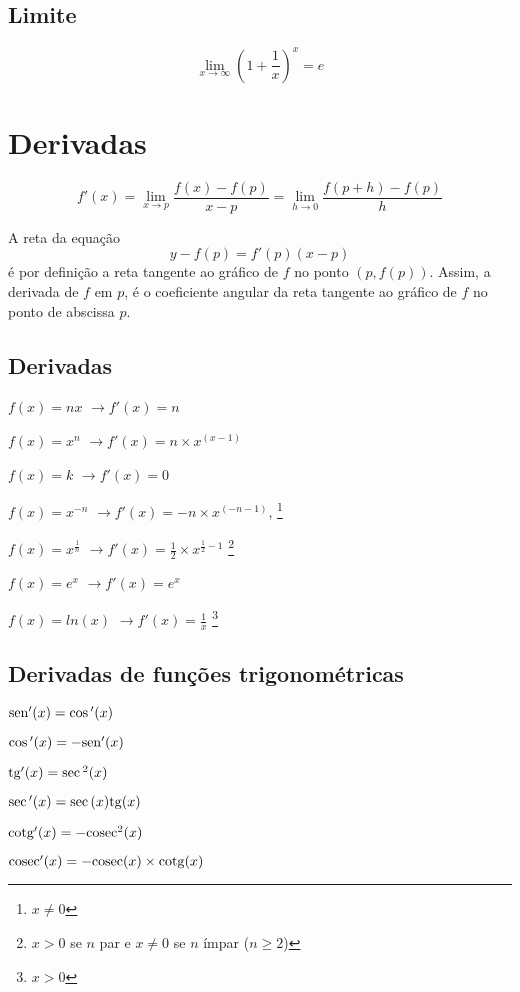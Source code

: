 \documentclass[11pt]{article}
\newcommand{\sen}{{\rm sen}}
\newcommand{\tg}{{\rm tg}}
\newcommand{\cosec}{{\rm cosec}}
\newcommand{\cotg}{{\rm cotg}}
\newcommand{\limit}[3]{{
  \underset{#1 \rightarrow #2}{\lim} #3
}}
\begin{document}
\subsection{Limite}

$$
\limit{x}{\infty}{(1+\frac{1}{x})^x} = e
$$

\section{Derivadas}

$$
f'(x) =
  \limit{x}{p}{ \frac{f(x) - f(p)}{x-p} =
  \limit{h}{0}{ \frac{f(p+h)- f(p)}{h} } }
$$

A reta da equação $$y-f(p)=f'(p)(x-p)$$ é por definição a reta tangente ao
gráfico de $f$ no ponto $(p, f(p))$. Assim, a derivada de $f$ em $p$, é o
coeficiente angular da reta tangente ao gráfico de $f$ no ponto de abscissa
$p$.

\subsection{Derivadas}

\begin{description}
  \begin{multicols}{2}
    \item[ $f(x) = nx$ ]       $ \to f'(x) = n $
    \item[ $f(x) = x^n$ ]      $ \to f'(x) = n\times x^{(x-1)}$
    \item[ $f(x) = k$ ]        $ \to f'(x) = 0$
    \item[ $f(x) = x^{-n}$ ]   $ \to f'(x) = -n\times x^{(-n-1)} $,
      \footnote{$x\neq 0$}
    \item[ $f(x) = x^{ \frac{1}{n} }$ ] $ \to f'(x) = \frac{1}{2} \times
      x^{\frac{1}{2}-1}$
      \footnote{$x>0$ se $n$ par e $x\neq 0$ se $n$ ímpar ($n\geq2$)}
    \item[ $f(x) = e^x$ ]      $ \to f'(x) = e^x $
    \item[ $f(x) = ln(x)$ ]    $ \to f'(x) = \frac{1}{x} $
      \footnote{$x>0$}
    \end{multicols}
\end{description}

\subsection{Derivadas de funções trigonométricas}

\begin{itemize}
  \begin{multicols}{3}
    \item $ \sen{'(x)} = \cos{'(x)} $
    \item $ \cos{'(x)} = -\sen{'(x)} $
    \item $ \tg{'(x)} = \sec{^2(x)} $
    \item $ \sec{'(x)} = \sec{(x)}\tg{(x)}$
    \item $ \cotg{'(x)} = -\cosec{^2(x)}$
    \item $ \cosec{'(x)} = -\cosec{(x)}\times \cotg{(x)}$
  \end{multicols}
\end{itemize}
\end{document}
